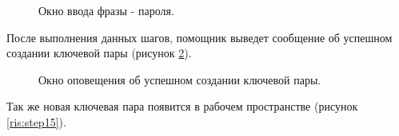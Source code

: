 \documentclass[10pt,a4paper]{report}
\begin{document}
\begin{figure}[h]
	\caption{Окно ввода фразы - пароля.}
	\label{ris:step13}

\end{figure}

После выполнения данных шагов, помощник выведет сообщение об успешном создании ключевой пары (рисунок \ref{ris:step14}).

\begin{figure}[h]
	\caption{Окно оповещения об успешном создании ключевой пары.}
	\label{ris:step14}
\end{figure}

Так же новая ключевая пара появится в рабочем пространстве (рисунок \ref{ris:step15}).
\end{document}
